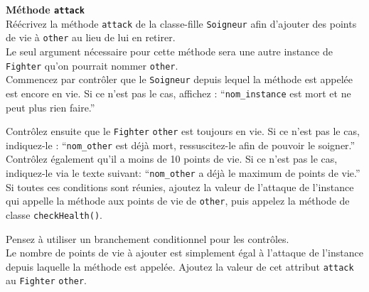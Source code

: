 \begin{Exercice}[10 minutes] \textbf{Méthode \lstinline{attack}} \\

Réécrivez la méthode \lstinline{attack} de la classe-fille \lstinline{Soigneur} afin d'ajouter des points de vie à \lstinline{other} au lieu de lui en retirer. \\

Le seul argument nécessaire pour cette méthode sera une autre instance de \lstinline{Fighter} qu'on pourrait nommer \lstinline{other}. \\

Commencez par contrôler que le \lstinline{Soigneur} depuis lequel la méthode est appelée est encore en vie. Si ce n'est pas le cas, affichez : ``\lstinline{nom_instance} est mort et ne peut plus rien faire.''

Contrôlez ensuite que le \lstinline{Fighter} \lstinline{other} est toujours en vie. Si ce n'est pas le cas, indiquez-le : ``\lstinline{nom_other} est déjà mort, ressuscitez-le afin de pouvoir le soigner.'' Contrôlez également qu'il a moins de 10 points de vie. Si ce n'est pas le cas, indiquez-le via le texte suivant: ``\lstinline{nom_other} a déjà le maximum de points de vie.'' \\

Si toutes ces conditions sont réunies, ajoutez la valeur de l'attaque de l'instance qui appelle la méthode aux points de vie de \lstinline{other}, puis appelez la méthode de classe \lstinline{checkHealth()}.

\begin{conseil}
Pensez à utiliser un branchement conditionnel pour les contrôles. \\

Le nombre de points de vie à ajouter est simplement égal à l'attaque de l'instance depuis laquelle la méthode est appelée. Ajoutez la valeur de cet attribut \lstinline{attack} au \lstinline{Fighter} \lstinline{other}.

\end{conseil}

\begin{solution}
	
\end{solution}

\end{Exercice}

